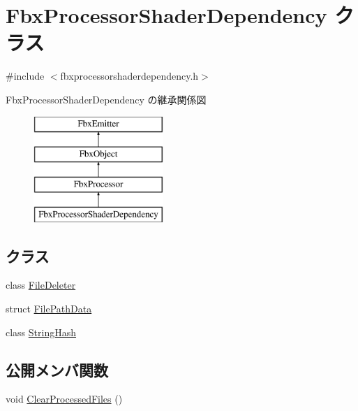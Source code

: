 \hypertarget{class_fbx_processor_shader_dependency}{}\section{Fbx\+Processor\+Shader\+Dependency クラス}
\label{class_fbx_processor_shader_dependency}


{\ttfamily \#include $<$fbxprocessorshaderdependency.\+h$>$}

Fbx\+Processor\+Shader\+Dependency の継承関係図\begin{figure}[H]
\begin{center}
\leavevmode
\includegraphics[height=4.000000cm]{class_fbx_processor_shader_dependency}
\end{center}
\end{figure}
\subsection*{クラス}
\begin{DoxyCompactItemize}
\item 
class \hyperlink{class_fbx_processor_shader_dependency_1_1_file_deleter}{File\+Deleter}
\item 
struct \hyperlink{struct_fbx_processor_shader_dependency_1_1_file_path_data}{File\+Path\+Data}
\item 
class \hyperlink{class_fbx_processor_shader_dependency_1_1_string_hash}{String\+Hash}
\end{DoxyCompactItemize}
\subsection*{公開メンバ関数}
\begin{DoxyCompactItemize}
\item 
void \hyperlink{class_fbx_processor_shader_dependency_a3c93c344271aa09caf870e35597a7b6a}{Clear\+Processed\+Files} ()
\end{DoxyCompactItemize}
